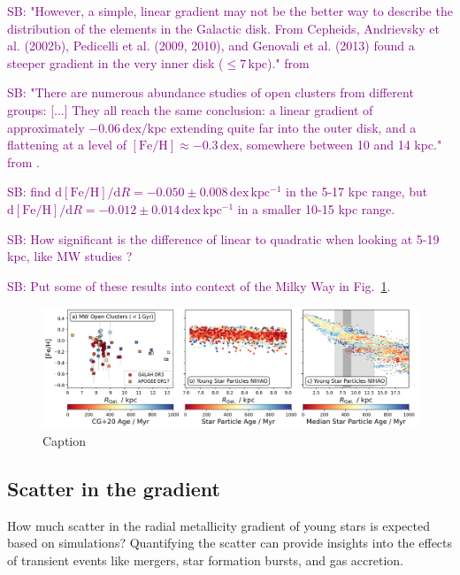 \documentclass[fleqn,usenatbib]{mnras}
\newcommand{\SB}[1]{{\textcolor{purple}{SB: #1}}}
\begin{document}
\SB{"However, a simple, linear gradient may not be the better way to describe the distribution of the elements in the Galactic disk. From Cepheids, Andrievsky et al. (2002b), Pedicelli et al. (2009, 2010), and Genovali et al. (2013) found a steeper gradient in the very inner disk ($\leq 7\,\mathrm{kpc}$)." from \citet{Lemasle2013}}

\SB{"There are numerous abundance studies of open clusters from different groups: [...] They all reach the same conclusion: a linear gradient of approximately $-0.06\,\mathrm{dex/kpc}$ extending quite far into the outer disk, and a flattening at a level of $\mathrm{[Fe/H]} \approx -0.3\,\mathrm{dex}$, somewhere between 10 and 14 kpc." from \citet{Lemasle2013}.}

\SB{\citet{Lemasle2008} find $\mathrm{d[Fe/H]}/\mathrm{d}R = -0.050 \pm 0.008\,\mathrm{dex\,kpc^{-1}}$ in the 5-17 kpc range, but $\mathrm{d[Fe/H]}/\mathrm{d}R = -0.012 \pm 0.014\,\mathrm{dex\,kpc^{-1}}$ in a smaller 10-15 kpc range.}

\SB{How significant is the difference of linear to quadratic when looking at 5-19 kpc, like MW studies \citep{Genovali2014}?}

\SB{Put some of these results into context of the Milky Way in Fig.~\ref{fig:radial_metallicity_gradients_mw_vs_nihao}.}

\begin{figure}
    \centering
    \includegraphics[width=\textwidth]{figures/radial_metallicity_gradients_mw_vs_nihao.png}
    \caption{Caption}
    \label{fig:radial_metallicity_gradients_mw_vs_nihao}
\end{figure}

\subsection{Scatter in the gradient} \label{sec:discussion_scatter}

How much scatter in the radial metallicity gradient of young stars is expected based on simulations? Quantifying the scatter can provide insights into the effects of transient events like mergers, star formation bursts, and gas accretion.
\end{document}
